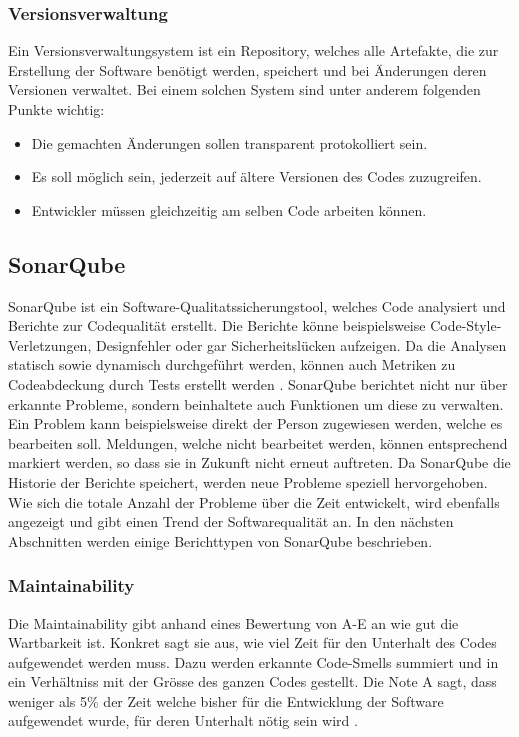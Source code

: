 \subsubsection{Versionsverwaltung}
Ein Versionsverwaltungsystem ist ein Repository, welches alle Artefakte, die zur Erstellung der Software benötigt werden, speichert und bei Änderungen deren Versionen verwaltet.
Bei einem solchen System sind unter anderem folgenden Punkte wichtig:
\begin{itemize}
   \item Die gemachten Änderungen sollen transparent protokolliert sein.
   \item Es soll möglich sein, jederzeit auf ältere Versionen des Codes zuzugreifen.
   \item Entwickler müssen gleichzeitig am selben Code arbeiten können.
\end{itemize}



\subsection{SonarQube}\label{quality:sonar}
SonarQube ist ein Software-Qualitatssicherungstool, welches Code analysiert und Berichte zur Codequalität erstellt.
Die Berichte könne beispielsweise Code-Style-Verletzungen, Designfehler oder gar Sicherheitslücken aufzeigen.
Da die Analysen statisch sowie dynamisch durchgeführt werden, können auch Metriken zu Codeabdeckung durch Tests erstellt werden \parencite{malloy_2021}.
SonarQube berichtet nicht nur über erkannte Probleme, sondern beinhaltete auch Funktionen um diese zu verwalten.
Ein Problem kann beispielsweise direkt der Person zugewiesen werden, welche es bearbeiten soll.
Meldungen, welche nicht bearbeitet werden, können entsprechend markiert werden, so dass sie in Zukunft nicht erneut auftreten.
Da SonarQube die Historie der Berichte speichert, werden neue Probleme speziell hervorgehoben.
Wie sich die totale Anzahl der Probleme über die Zeit entwickelt, wird ebenfalls angezeigt und gibt einen Trend der Softwarequalität an.
In den nächsten Abschnitten werden einige Berichttypen von SonarQube beschrieben.


\subsubsection{Maintainability}
Die Maintainability gibt anhand eines Bewertung von A-E an wie gut die Wartbarkeit ist.
Konkret sagt sie aus, wie viel Zeit für den Unterhalt des Codes aufgewendet werden muss.
Dazu werden erkannte Code-Smells summiert und in ein Verhältniss mit der Grösse des ganzen Codes gestellt.
Die Note A sagt, dass weniger als 5\% der Zeit welche bisher für die Entwicklung der Software aufgewendet wurde, für deren Unterhalt nötig sein wird \parencite{sonarQubeMetrics}.

